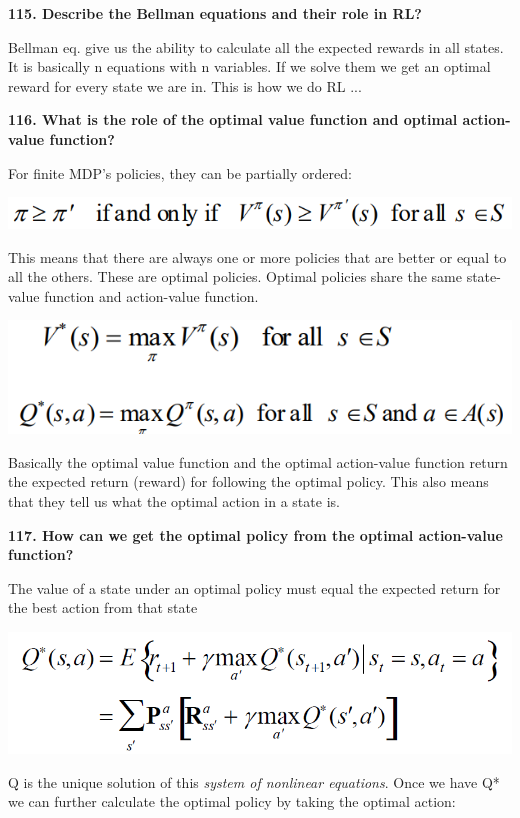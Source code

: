 \textbf{115. Describe the Bellman equations and their role in RL?}

Bellman eq. give us the ability to calculate all the expected rewards in
all states. It is basically n equations with n variables. If we solve
them we get an optimal reward for every state we are in. This is how we
do RL ...

\textbf{116. What is the role of the optimal value function and optimal
action-value function?}

For finite MDP's policies, they can be partially ordered:

\includegraphics[width=\columnwidth]{media/image39.png}

This means that there are always one or more policies that are better or
equal to all the others. These are optimal policies. Optimal policies
share the same state-value function and action-value function.

\includegraphics[width=\columnwidth]{media/image9.png}

Basically the optimal value function and the optimal action-value
function return the expected return (reward) for following the optimal
policy. This also means that they tell us what the optimal action in a
state is.

\textbf{117. How can we get the optimal policy from the optimal
action-value function?}

The value of a state under an optimal policy must equal the expected
return for the best action from that state

\includegraphics[width=\columnwidth]{media/image31.png}

Q is the unique solution of this \emph{system of nonlinear equations}.
Once we have Q* we can further calculate the optimal policy by taking
the optimal action:

